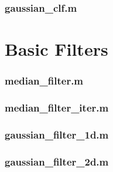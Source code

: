 \subsubsection*{\hypertarget{gaussianclf}{gaussian\_clf.m}}



\newpage
\section{Basic Filters}
\subsubsection*{\hypertarget{medianfilter}{median\_filter.m}}


\subsubsection*{\hypertarget{medianfiliter}{median\_filter\_iter.m}}


\subsubsection*{\hypertarget{gaussfilter}{gaussian\_filter\_1d.m}}


\subsubsection*{\hypertarget{gauss2d}{gaussian\_filter\_2d.m}}



